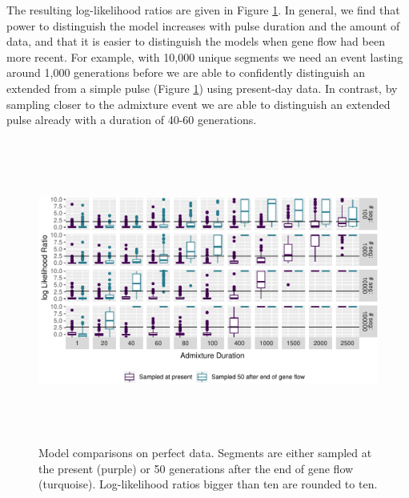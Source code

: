 \documentclass[11pt]{article}
\begin{document}
The resulting log-likelihood ratios are given in Figure \ref{fig:fig1_1}. In general, we find that power to distinguish the model increases with pulse duration and the amount of data, and that it is easier to distinguish the models when gene flow had been more recent.  For example, with 10,000 unique segments we need an event lasting around 1,000 generations before we are able to confidently distinguish an extended from a simple pulse (Figure \ref{fig:fig1_1}) using present-day data. In contrast, by sampling closer to the admixture event we are able to distinguish an extended pulse already with a duration of 40-60 generations.

\begin{figure}[ht]
\centering
\includegraphics[width=16cm,height=10cm,keepaspectratio]{Fig_2_MBE-21-0164_R1_Peter_Iasi.pdf}
\caption{\label{fig:fig1_1} Model comparisons on perfect data. Segments are either sampled at the present (purple) or 50 generations after the end of gene flow (turquoise). Log-likelihood ratios bigger than ten are rounded to ten.}
\end{figure}
\end{document}
